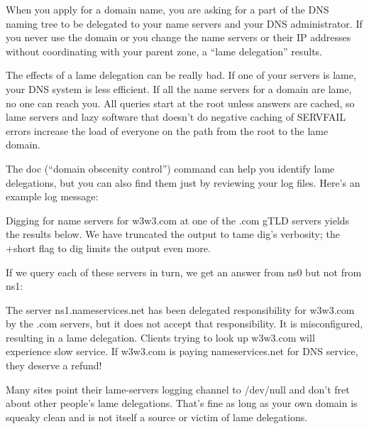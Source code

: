 \protect\hypertarget{part0024_split_072.htmlux5cux23_idIndexMarker2295}{}{}\protect\hypertarget{part0024_split_072.htmlux5cux23_idIndexMarker2296}{}{}When
you apply for a domain name, you are asking for a part of the DNS naming
tree to be delegated to your name servers and your DNS administrator. If
you never use the domain or you change the name servers or their IP
addresses without coordinating with your parent zone, a ``lame
delegation'' results.

The effects of a lame delegation can be really bad. If one of your
servers is lame, your DNS system is less efficient. If all the name
servers for a domain are lame, no one can reach you. All queries start
at the root unless answers are cached, so lame servers and lazy software
that doesn't do negative caching of
\protect\hypertarget{part0024_split_072.htmlux5cux23_idIndexMarker2297}{}{}SERVFAIL
errors increase the load of everyone on the path from the root to the
lame domain.

The
{doc}{\protect\hypertarget{part0024_split_072.htmlux5cux23_idIndexMarker2298}{}{}\protect\hypertarget{part0024_split_072.htmlux5cux23_idIndexMarker2299}{}{}}
(``domain obscenity control'') command can help you identify lame
delegations, but you can also find them just by reviewing your log
files. Here's an example log message:


Digging for name servers for w3w3.com at one of the .com gTLD servers
yields the results below. We have truncated the output to tame {dig}'s
verbosity; the {+short} flag to {dig} limits the output even more.


If we query each of these servers in turn, we get an answer from ns0 but
not from ns1:


The server ns1.nameservices.net has been delegated responsibility for
w3w3.com by the .com servers, but it does not accept that
responsibility. It is misconfigured, resulting in a lame delegation.
Clients trying to look up w3w3.com will experience slow service. If
w3w3.com is paying nameservices.net for DNS service, they deserve a
refund!

Many sites point their {lame-servers} logging channel to {/dev/null} and
don't fret about other people's lame delegations. That's fine as long as
your own domain is squeaky clean and is not itself a source or victim of
lame delegations.


